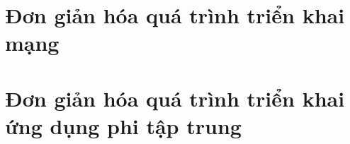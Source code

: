 \documentclass[../DoAn.tex]{subfiles}
\begin{document}
\section{Đơn giản hóa quá trình triển khai mạng}

\section{Đơn giản hóa quá trình triển khai ứng dụng phi tập trung}

\section{}
\end{document}
